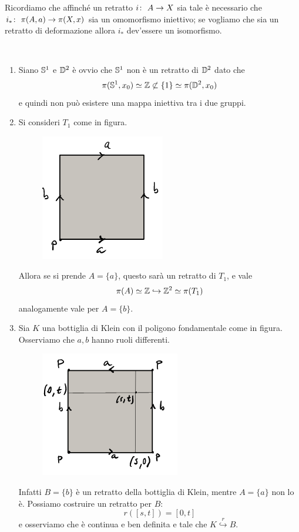 
\begin{remark}
	Ricordiamo che affinché un retratto $\morphism{i}{A}{X}$ sia tale è necessario che $\morphism{i_*}{\pi(A, a)}{\pi(X, x)}$ sia un omomorfismo iniettivo; se vogliamo che sia un retratto di deformazione allora $i_*$ dev'essere un isomorfismo. 
\end{remark}

\begin{example}\
	\begin{enumerate}
		\item Siano $\S^1$ e $\D^2$ è ovvio che $\S^1$ non è un retratto di $\D^2$ dato che
		\begin{equation*}
		\pi(\S^1, x_0) \simeq \Z \not\subset \{1\} \simeq \pi(\D^2, x_0)
		\end{equation*}
		e quindi non può esistere una mappa iniettiva tra i due gruppi. 
		\item Si consideri $T_1$ come in figura.
		\begin{figure}[H]
			\centering
			\includegraphics[width=0.3\linewidth]{images/topologia_algebrica/torus_polygon}
			\caption{}
			\label{fig:toruspolygon}
		\end{figure}
		Allora se si prende $A = \{a\}$, questo sarà un retratto di $T_1$, e vale
		\begin{equation*}
			\pi(A) \simeq \Z \hookrightarrow \Z^2 \simeq \pi(T_1)
		\end{equation*}
		analogamente vale per $A = \{b\}$.
		\item Sia $K$ una bottiglia di Klein con il poligono fondamentale come in figura. Osserviamo che $a, b$ hanno ruoli differenti. 
		\begin{figure}[H]
			\centering
			\includegraphics[width=0.3\linewidth]{images/topologia_algebrica/klein_polygon}
			\caption{}
			\label{fig:kelinpolygon}
		\end{figure}
		Infatti $B = \{b\}$ è un retratto della bottiglia di Klein, mentre $A = \{a\}$ non lo è. Possiamo costruire un retratto per $B$: 
		\begin{equation*}
			r(\left[s,t\right]) = \left[0,t\right]
		\end{equation*}
		e osserviamo che è continua e ben definita e tale che $K \overset{r}{\hookrightarrow} B$.\
		

\end{enumerate}
\end{example}
